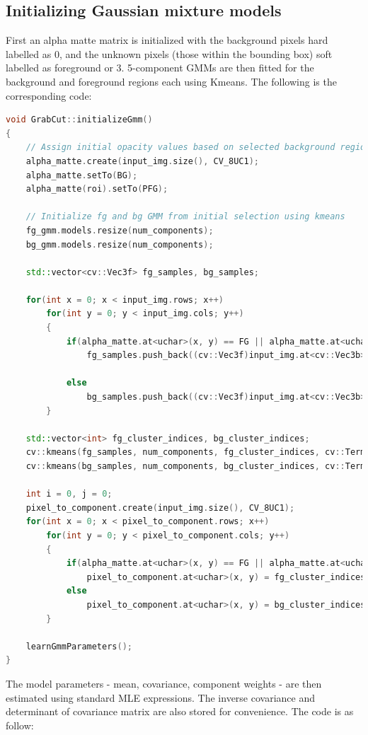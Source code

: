 \documentclass[a4paper,11]{article}
\begin{document}
  
  \subsection{Initializing Gaussian mixture models}
  
  First an alpha matte matrix is initialized with the background pixels hard labelled as $0$, and the unknown pixels (those within the bounding box) soft labelled as foreground or $3$. 5-component GMMs are then fitted for the background and foreground regions each using Kmeans. The following is the corresponding code:
  \begin{lstlisting}[language=C++]
void GrabCut::initializeGmm()
{
	// Assign initial opacity values based on selected background region
	alpha_matte.create(input_img.size(), CV_8UC1);	
	alpha_matte.setTo(BG);
	alpha_matte(roi).setTo(PFG);

	// Initialize fg and bg GMM from initial selection using kmeans
	fg_gmm.models.resize(num_components);
	bg_gmm.models.resize(num_components);

	std::vector<cv::Vec3f> fg_samples, bg_samples;

	for(int x = 0; x < input_img.rows; x++)
		for(int y = 0; y < input_img.cols; y++)
		{
			if(alpha_matte.at<uchar>(x, y) == FG || alpha_matte.at<uchar>(x, y) == PFG)
				fg_samples.push_back((cv::Vec3f)input_img.at<cv::Vec3b>(x, y));

			else
				bg_samples.push_back((cv::Vec3f)input_img.at<cv::Vec3b>(x, y));
		}

	std::vector<int> fg_cluster_indices, bg_cluster_indices;
	cv::kmeans(fg_samples, num_components, fg_cluster_indices, cv::TermCriteria(CV_TERMCRIT_ITER, 10, 0.0), 0, cv::KMEANS_PP_CENTERS);
	cv::kmeans(bg_samples, num_components, bg_cluster_indices, cv::TermCriteria(CV_TERMCRIT_ITER, 10, 0.0), 0, cv::KMEANS_PP_CENTERS);

	int i = 0, j = 0;
	pixel_to_component.create(input_img.size(), CV_8UC1);
	for(int x = 0; x < pixel_to_component.rows; x++)
		for(int y = 0; y < pixel_to_component.cols; y++)
		{
			if(alpha_matte.at<uchar>(x, y) == FG || alpha_matte.at<uchar>(x, y) == PFG)
				pixel_to_component.at<uchar>(x, y) = fg_cluster_indices[i++];
			else
				pixel_to_component.at<uchar>(x, y) = bg_cluster_indices[j++];
		}

	learnGmmParameters();
}
  \end{lstlisting}
  
  The model parameters - mean, covariance, component weights - are then estimated using standard MLE expressions. The inverse covariance and determinant of covariance matrix are also stored for convenience. The code is as follow:
  
\end{document}
